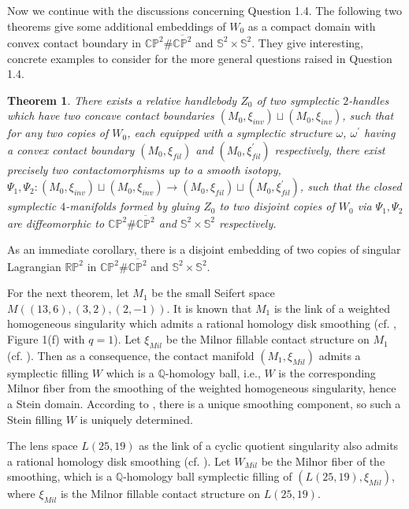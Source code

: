 \documentclass[11pt]{amsart}
\theoremstyle{plain}
\newtheorem{theorem}{Theorem}
\numberwithin{theorem}{section}
\theoremstyle{definition}
\newcommand{\C}{{\mathbb C}}
\newcommand{\R}{{\mathbb R}}
\newcommand{\Q}{{\mathbb Q}}
\renewcommand{\P}{{\mathbb P}}
\newcommand{\s}{{\mathbb S}}
\begin{document}
Now we continue with the discussions concerning Question 1.4. The following two theorems give some additional embeddings of $W_0$ as a compact domain with convex contact boundary in 
$\C\P^2\# \overline{\C\P^2}$ and $\s^2\times \s^2$. They give interesting, concrete examples to consider for the more general questions raised in Question 1.4. 


\begin{theorem}
There exists a relative handlebody $Z_0$ of two symplectic $2$-handles which have two concave
contact boundaries $(M_0,\xi_{inv})\sqcup (M_0,\xi_{inv})$, such that for any two copies of $W_0$,
each equipped with a symplectic structure $\omega$, $\omega^\prime$ having a convex contact
boundary $(M_0,\xi_{fil})$ and $(M_0,\xi^\prime_{fil})$ respectively, there exist precisely two 
contactomorphisms up to a smooth isotopy, $\Psi_1,\Psi_2: (M_0,\xi_{inv})\sqcup (M_0,\xi_{inv})
\rightarrow (M_0,\xi_{fil})\sqcup (M_0,\xi^\prime_{fil})$, such that the closed symplectic $4$-manifolds
formed by gluing $Z_0$ to two disjoint copies of $W_0$ via $\Psi_1,\Psi_2$ are diffeomorphic to
$\C\P^2\# \overline{\C\P^2}$ and $\s^2\times \s^2$ respectively. 
\end{theorem}

As an immediate corollary, there is a disjoint embedding of two copies of singular Lagrangian 
$\R\P^2$ in $\C\P^2\# \overline{\C\P^2}$ and $\s^2\times \s^2$. 

For the next theorem, let $M_1$ be the small Seifert space $M((13,6), (3,2), (2,-1))$. It is known that $M_1$ is
the link of a weighted homogeneous singularity which admits a rational homology disk smoothing
(cf. \cite{BS}, Figure 1(f) with $q=1$). Let $\xi_{Mil}$ be the Milnor fillable contact structure on 
$M_1$ (cf. \cite{CNP}). Then as a consequence, the contact manifold $(M_1,\xi_{Mil})$ admits a symplectic filling $W$ which is a $\Q$-homology ball, i.e., $W$ is the corresponding Milnor fiber from the smoothing of the weighted homogeneous singularity, hence a Stein domain. According 
to \cite{W}, there is a unique smoothing component, so such a Stein filling $W$ is uniquely determined. 

The lens space $L(25,19)$ as the link of a cyclic quotient singularity also admits a rational homology disk smoothing
(cf. \cite{W0}). Let $W_{Mil}$ be the Milnor fiber of the smoothing, which is a $\Q$-homology ball symplectic filling of $(L(25,19),\xi_{Mil})$, where $\xi_{Mil}$ is the Milnor fillable contact structure on $L(25,19)$. 
\end{document}

